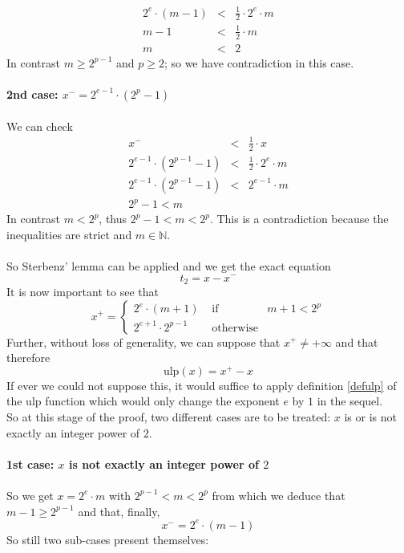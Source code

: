 \documentclass[a4paper,10pt,twoside]{article}
\newenvironment{proof}[1][Proof]{\begin{trivlist}
\item[\hskip \labelsep {\bfseries #1}]}{\end{trivlist}}
\newcommand{\N}{\ensuremath{\mathbb {N}}}
\newcommand{\mUlp}{\ensuremath{\mathrm{ulp}}}
\begin{document}
\begin{proof}
\begin{eqnarray*}
2^e \cdot \left( m - 1 \right) & < & \frac{1}{2} \cdot 2^e \cdot m \\
m-1 & < & \frac{1}{2} \cdot m \\
m & < & 2
\end{eqnarray*}
In contrast $m \geq 2^{p-1}$ and $p\geq2$; so we have contradiction in this case. \\ ~ \\
{\bf 2nd case: $x^- = 2^{e-1} \cdot  \left( 2^p -1 \right)$ } \\ ~ \\
We can check
\begin{eqnarray*}
x^- & < & \frac{1}{2} \cdot x \\
2^{e-1} \cdot \left( 2^{p-1} - 1 \right) & < & \frac{1}{2} \cdot 2^e \cdot m \\
2^{e-1} \cdot \left( 2^{p-1} - 1 \right) & < & 2^{e-1} \cdot m \\
2^p - 1 < m
\end{eqnarray*}
In contrast $m<2^p$, thus $2^p - 1 < m < 2^p$.
This is a contradiction because the inequalities are strict and $m \in \N$. \\ ~ \\
So Sterbenz' lemma \cite{Ste74} can be applied and we get the exact equation
$$t_2 = x - x^-$$
It is now important to see that
$$x^+ = \left \lbrace \begin{array}{lll} 2^e \cdot \left(m + 1 \right) & \mbox{ if } & m+1 < 2^p \\
                                             2^{e+1} \cdot 2^{p-1} & \mbox{ otherwise} & \end{array} \right.$$
Further, without loss of generality, we can suppose that $x^+ \not = + \infty$ and that therefore
$$\mUlp \left( x \right) = x^+ - x$$
If ever we could not suppose this, it would suffice to apply definition \ref{defulp} of the
$\mUlp$ function which would only change the exponent $e$ by $1$ in the sequel.\\
So at this stage of the proof, two different cases are to be treated:
$x$ is or is not exactly an integer power of $2$. \\ ~ \\
{\bf 1st case: $x$ is not exactly an integer power of $2$ } \\ ~ \\
So we get $x=2^e \cdot m$ with $2^{p-1} < m < 2^p$ from which we deduce that $m-1 \geq 2^{p-1}$ and that, finally,
$$x^- = 2^e \cdot \left(m - 1 \right)$$
So still two sub-cases present themselves: \\ ~ \\

\end{proof}
\end{document}
